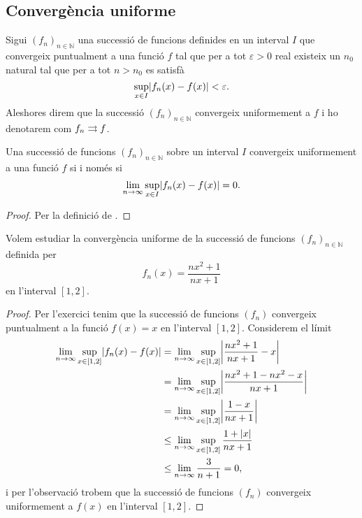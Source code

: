\documentclass[../../Main.tex]{subfiles}
\begin{document}
	\subsection{Convergència uniforme}
	\begin{definition}
		\label{def:convergència uniforme}
		Sigui \((f_{n})_{n\in\mathbb{N}}\) una successió de funcions definides en un interval \(I\) que convergeix puntualment a una funció \(f\) tal que per a tot \(\varepsilon>0\) real existeix un \(n_{0}\) natural tal que per a tot \(n>n_{0}\) es satisfà
		\[\sup_{x\in I}\abs{f_{n}(x)-f(x)}<\varepsilon.\]
		Aleshores direm que la successió \((f_{n})_{n\in\mathbb{N}}\) convergeix uniformement a \(f\) i ho denotarem com \(f_{n}\mathrel{\rightrightarrows} f\).
	\end{definition}
	\begin{observation}
		\label{obs:convergència uniforme amb límits}
		Una successió de funcions \((f_{n})_{n\in\mathbb{N}}\) sobre un interval \(I\) convergeix uniformement a una funció \(f\) si i només si
		\[\lim_{n\to\infty}\sup_{x\in I}\abs{f_{n}(x)-f(x)}=0.\]
		\begin{proof}
			Per la definició de .
		\end{proof}
	\end{observation}
	\begin{example}
		\label{ex:convergència uniforme d'una successió de funcions}
		Volem estudiar la convergència uniforme de la successió de funcions \((f_{n})_{n\in\mathbb{N}}\) definida per
		\[f_{n}(x)=\frac{nx^{2}+1}{nx+1}\]
		en l'interval \([1,2]\).
		\begin{proof}
			Per l'exercici  tenim que la successió de funcions \((f_{n})\) convergeix puntualment a la funció \(f(x)=x\) en l'interval \([1,2]\). Considerem el límit
			\begin{align*}
				\lim_{n\to\infty}\sup_{x\in[1,2]}\abs{f_{n}(x)-f(x)}&=\lim_{n\to\infty}\sup_{x\in[1,2]}\abs{\frac{nx^{2}+1}{nx+1}-x} \\
				&=\lim_{n\to\infty}\sup_{x\in[1,2]}\abs{\frac{nx^{2}+1-nx^{2}-x}{nx+1}} \\
				&=\lim_{n\to\infty}\sup_{x\in[1,2]}\abs{\frac{1-x}{nx+1}} \\
				&\leq\lim_{n\to\infty}\sup_{x\in[1,2]}\frac{1+\abs{x}}{nx+1} \\
				&\leq\lim_{n\to\infty}\frac{3}{n+1}=0,
			\end{align*}
			i per l'observació  trobem que la successió de funcions \((f_{n})\) convergeix uniformement a \(f(x)\) en l'interval \([1,2]\). 
		\end{proof}
	\end{example}
\end{document}
